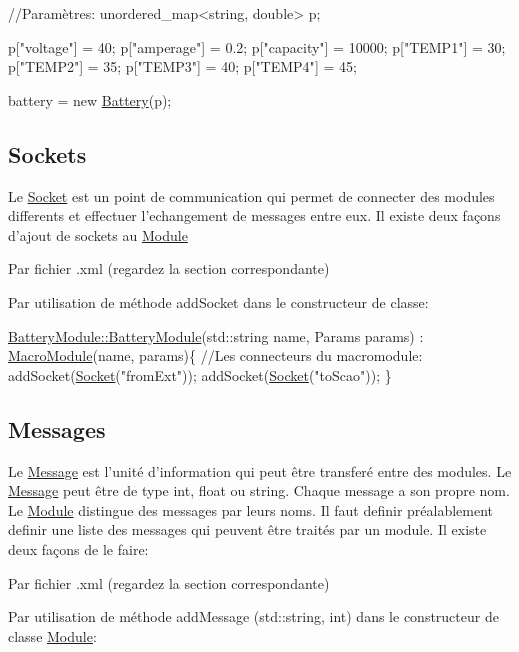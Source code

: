 \begin{DoxyCode}
\textcolor{comment}{//Paramètres:}
unordered\_map<string, double> p;

p[\textcolor{stringliteral}{"voltage"}] = 40;
p[\textcolor{stringliteral}{"amperage"}] = 0.2;
p[\textcolor{stringliteral}{"capacity"}] = 10000;
p[\textcolor{stringliteral}{"TEMP1"}] = 30;
p[\textcolor{stringliteral}{"TEMP2"}] = 35;
p[\textcolor{stringliteral}{"TEMP3"}] = 40;
p[\textcolor{stringliteral}{"TEMP4"}] = 45;

battery = \textcolor{keyword}{new} \hyperlink{classBattery}{Battery}(p);
\end{DoxyCode}
\hypertarget{docModule_sockets}{}\subsection{Sockets}\label{docModule_sockets}
Le \hyperlink{classSocket}{Socket} est un point de communication qui permet de connecter des modules differents et effectuer l'echangement de messages entre eux. Il existe deux façons d'ajout de sockets au \hyperlink{classModule}{Module} \begin{DoxyItemize}
\item Par fichier .xml (regardez la section correspondante) \item Par utilisation de méthode add\-Socket dans le constructeur de classe\-: 
\begin{DoxyCode}
\hyperlink{classBatteryModule_a2fb494ef5f124c38c0fdf9ccfb31918f}{BatteryModule::BatteryModule}(std::string name, 
      Params params) : \hyperlink{classMacroModule}{MacroModule}(name, params)\{
    \textcolor{comment}{//Les connecteurs du macromodule:}
    addSocket(\hyperlink{classSocket}{Socket}(\textcolor{stringliteral}{"fromExt"}));
    addSocket(\hyperlink{classSocket}{Socket}(\textcolor{stringliteral}{"toScao"}));
\}
\end{DoxyCode}
\end{DoxyItemize}
\hypertarget{docModule_messages}{}\subsection{Messages}\label{docModule_messages}
Le \hyperlink{classMessage}{Message} est l'unité d'information qui peut être transferé entre des modules. Le \hyperlink{classMessage}{Message} peut être de type int, float ou string. Chaque message a son propre nom. Le \hyperlink{classModule}{Module} distingue des messages par leurs noms. Il faut definir préalablement definir une liste des messages qui peuvent être traités par un module. Il existe deux façons de le faire\-: \begin{DoxyItemize}
\item Par fichier .xml (regardez la section correspondante) \item Par utilisation de méthode {\ttfamily add\-Message (std\-::string, int)} dans le constructeur de classe \hyperlink{classModule}{Module}\-:\end{DoxyItemize}

